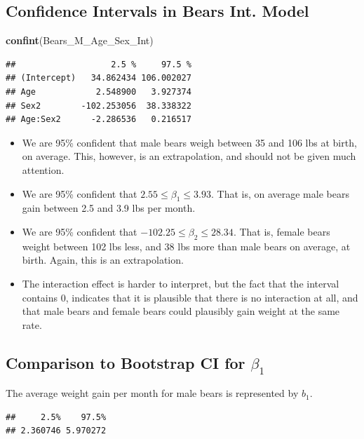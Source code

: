 \documentclass[]{book}
\newenvironment{Shaded}{\begin{snugshade}}{\end{snugshade}}
\newcommand{\KeywordTok}[1]{\textcolor[rgb]{0.13,0.29,0.53}{\textbf{#1}}}
\newcommand{\NormalTok}[1]{#1}
\begin{document}
\subsection{Confidence Intervals in Bears Int.
Model}\label{confidence-intervals-in-bears-int.-model}

\begin{Shaded}
\begin{Highlighting}[]
\KeywordTok{confint}\NormalTok{(Bears_M_Age_Sex_Int)}
\end{Highlighting}
\end{Shaded}

\begin{verbatim}
##                   2.5 %     97.5 %
## (Intercept)   34.862434 106.002027
## Age            2.548900   3.927374
## Sex2        -102.253056  38.338322
## Age:Sex2      -2.286536   0.216517
\end{verbatim}

\begin{itemize}
\item
  We are 95\% confident that male bears weigh between 35 and 106 lbs at
  birth, on average. This, however, is an extrapolation, and should not
  be given much attention.
\item
  We are 95\% confident that \(2.55 \leq \beta_1 \leq 3.93\). That is,
  on average male bears gain between 2.5 and 3.9 lbs per month.
\item
  We are 95\% confident that \(-102.25 \leq \beta_2 \leq 28.34\). That
  is, female bears weight between 102 lbs less, and 38 lbs more than
  male bears on average, at birth. Again, this is an extrapolation.
\item
  The interaction effect is harder to interpret, but the fact that the
  interval contains 0, indicates that it is plausible that there is no
  interaction at all, and that male bears and female bears could
  plausibly gain weight at the same rate.
\end{itemize}

\subsection{\texorpdfstring{Comparison to Bootstrap CI for
\(\beta_1\)}{Comparison to Bootstrap CI for \textbackslash{}beta\_1}}\label{comparison-to-bootstrap-ci-for-beta_1}

The average weight gain per month for male bears is represented by
\(b_1\).

\begin{verbatim}
##     2.5%    97.5% 
## 2.360746 5.970272
\end{verbatim}
\end{document}
